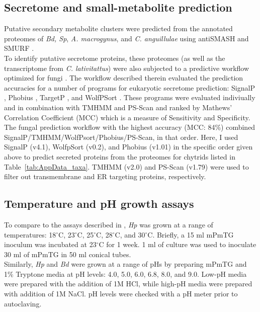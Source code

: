 \subsection*{Secretome and small-metabolite prediction}
Putative secondary metabolite clusters were predicted from the annotated proteomes of \textit{Bd, Sp}, \textit{A. macrogynus}, and \textit{C. anguillulae} using antiSMASH \cite{Blin2013} and SMURF \cite{Khaldi2010}.\\
\indent To identify putative secretome proteins, these proteomes (as well as the transcriptome
from \textit{C. lativitattus}) were also subjected to a
predictive workflow optimized for fungi \cite{Min2010}. The workflow described therein
evaluated the prediction accuracies for a number of programs for eukaryotic secretome prediction:
SignalP \cite{Bendtsen2004}, Phobius \cite{Kall2004,Kall2007}, TargetP
\cite{Emanuelsson2000,Emanuelsson2007}, and WolfPSort \cite{Sprenger2006,Horton2007}.
These programs were evaluated indiviually and in combination with TMHMM \cite{Krogh2001} and PS-Scan
\cite{deCastro2006} and ranked by Mathews' Correlation Coefficient (MCC) \cite{Matthews1975,Baldi2000,Menne2000}
which is a measure of Sensitivity and Specificity. The fungal prediction workflow with
the highest accuracy (MCC: 84\%) combined SignalP/TMHMM/WolfPsort/Phobius/PS-Scan, in that order.
Here, I used SignalP (v4.1), WolfpSort (v0.2), and Phobius (v1.01) in the specific order given above to predict secreted proteins from
the proteomes for chytrids listed in Table~\ref{tab:AppData_taxa}. TMHMM (v2.0) and PS-Scan (v1.79) were
used to filter out transmembrane and ER targeting proteins, respectively.\\

\subsection*{Temperature and pH growth assays}
To compare to the assays described in \cite{Piotrowski2004}, \textit{Hp} was grown at a range of temperatures: 18$^{\circ}$C, 23$^{\circ}$C, 25$^{\circ}$C, 28$^{\circ}$C, and 30$^{\circ}$C. Briefly, a 15 ml mPmTG inoculum was incubated at 23$^{\circ}$C for 1 week. 1 ml of culture was used to inoculate 30 ml of mPmTG in 50 ml conical tubes. \\
\indent Similarly, \textit{Hp} and \textit{Bd} were grown at a range of pHs by preparing mPmTG and 1\% Tryptone media at pH levels: 4.0, 5.0, 6.0, 6.8, 8.0, and 9.0. Low-pH media were prepared with the addition of 1M HCl, while high-pH media were prepared with addition of 1M NaCl. pH levels were checked with a pH meter prior to autoclaving.\\

